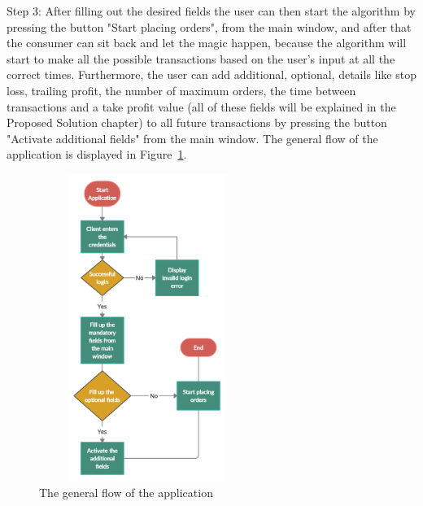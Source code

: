 \documentclass[12pt,a4paper]{report}
\begin{document}
Step 3:
After filling out the desired fields the user can then start the algorithm by pressing the button "Start placing orders", from the main window, and after that the consumer can sit back and let the magic happen, because the algorithm will start to make all the possible transactions based on the user's input at all the correct times. Furthermore, the user can add additional, optional, details like stop loss, trailing profit, the number of maximum orders, the time between transactions and a take profit value (all of these fields will be explained in the Proposed Solution chapter) to all future transactions by pressing the button "Activate additional fields" from the main window. The general flow of the application is displayed in Figure~\ref{fig:appflow}.
\begin{figure}[!ht]
	\centering
	\includegraphics[width=7cm,height=10cm]{pics/appflow.png}
	\caption{The general flow of the application}
	\label{fig:appflow}
\end{figure}
\end{document}

